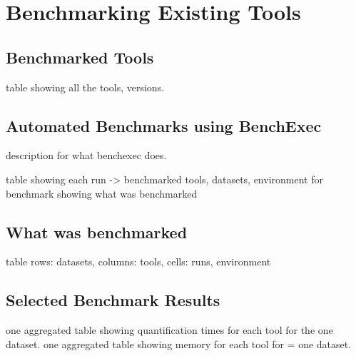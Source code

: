 \chapter{Benchmarking Existing Tools}
\label{ch:benchmarking}

\section{Benchmarked Tools}
table showing all the tools, versions.
\section{Automated Benchmarks using BenchExec}
description for what benchexec does.

table showing each run -> {benchmarked tools, datasets, environment for benchmark}
showing what was benchmarked

\section{What was benchmarked}
table rows: datasets, columns: tools, cells: runs, environment

\section{Selected Benchmark Results}
one aggregated table showing quantification times for each tool for the one dataset.
one aggregated table showing memory for each tool for = one dataset.
% 